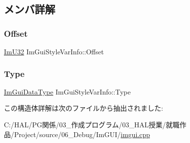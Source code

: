 \subsection{メンバ詳解}
\mbox{\label{struct_im_gui_style_var_info_ae900d6a02166d3d0433c18b95aec10e8}} 
\subsubsection{\texorpdfstring{Offset}{Offset}}
{\footnotesize\ttfamily \mbox{\hyperlink{imgui_8h_a118cff4eeb8d00e7d07ce3d6460eed36}{Im\+U32}} Im\+Gui\+Style\+Var\+Info\+::\+Offset}

\mbox{\label{struct_im_gui_style_var_info_a62f42d2bb7b71b7530493e16e622cb81}} 
\subsubsection{\texorpdfstring{Type}{Type}}
{\footnotesize\ttfamily \mbox{\hyperlink{imgui__internal_8h_a22f27475affc8d8a1f2407887e5e1d19}{Im\+Gui\+Data\+Type}} Im\+Gui\+Style\+Var\+Info\+::\+Type}



この構造体詳解は次のファイルから抽出されました\+:\begin{DoxyCompactItemize}
\item 
C\+:/\+H\+A\+L/\+P\+G関係/03\+\_\+作成プログラム/03\+\_\+\+H\+A\+L授業/就職作品/\+Project/source/06\+\_\+\+Debug/\+Im\+G\+U\+I/\mbox{\hyperlink{imgui_8cpp}{imgui.\+cpp}}\end{DoxyCompactItemize}

